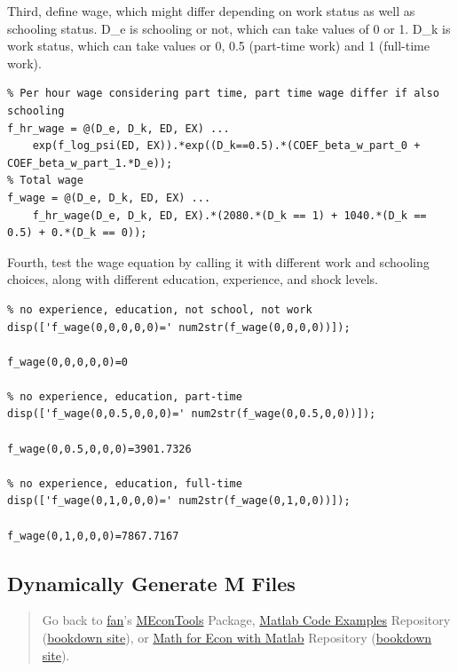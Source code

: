 \documentclass[
]{book}
\begin{document}
Third, define wage, which might differ depending on work status as well
as schooling status. D\_e is schooling or not, which can take values of 0
or 1. D\_k is work status, which can take values or 0, 0.5 (part-time
work) and 1 (full-time work).

\begin{verbatim}
% Per hour wage considering part time, part time wage differ if also schooling
f_hr_wage = @(D_e, D_k, ED, EX) ...
    exp(f_log_psi(ED, EX)).*exp((D_k==0.5).*(COEF_beta_w_part_0 + COEF_beta_w_part_1.*D_e));
% Total wage
f_wage = @(D_e, D_k, ED, EX) ...
    f_hr_wage(D_e, D_k, ED, EX).*(2080.*(D_k == 1) + 1040.*(D_k == 0.5) + 0.*(D_k == 0));
\end{verbatim}

Fourth, test the wage equation by calling it with different work and
schooling choices, along with different education, experience, and shock
levels.

\begin{verbatim}
% no experience, education, not school, not work
disp(['f_wage(0,0,0,0,0)=' num2str(f_wage(0,0,0,0))]);

f_wage(0,0,0,0,0)=0

% no experience, education, part-time
disp(['f_wage(0,0.5,0,0,0)=' num2str(f_wage(0,0.5,0,0))]);

f_wage(0,0.5,0,0,0)=3901.7326

% no experience, education, full-time
disp(['f_wage(0,1,0,0,0)=' num2str(f_wage(0,1,0,0))]);

f_wage(0,1,0,0,0)=7867.7167
\end{verbatim}

\hypertarget{dynamically-generate-m-files}{%
\subsection{Dynamically Generate M Files}\label{dynamically-generate-m-files}}

\begin{quote}
Go back to \href{http://fanwangecon.github.io/}{fan}'s \href{https://fanwangecon.github.io/MEconTools/}{MEconTools} Package, \href{https://fanwangecon.github.io/M4Econ/}{Matlab Code Examples} Repository (\href{https://fanwangecon.github.io/M4Econ/bookdown}{bookdown site}), or \href{https://fanwangecon.github.io/Math4Econ/}{Math for Econ with Matlab} Repository (\href{https://fanwangecon.github.io/Math4Econ/bookdown}{bookdown site}).
\end{quote}
\end{document}
